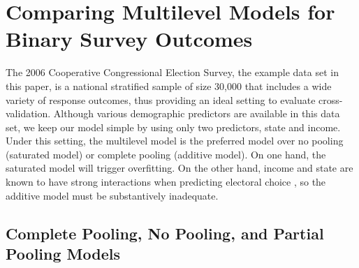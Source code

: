 \documentclass[sii]{ipart}
\begin{document}



\section{Comparing Multilevel Models for Binary Survey Outcomes}

The 2006 Cooperative Congressional Election Survey, the example data set in
this paper, is a national stratified sample of size 30,000 that includes a wide
variety of response outcomes,
thus providing an ideal setting to evaluate cross-validation. Although various
demographic predictors are available in this data set, we keep our model simple
by using only two predictors, state and income. Under this setting, the
multilevel model is the preferred model over no pooling (saturated model) or
complete pooling (additive model). On one hand, the saturated model will trigger
overfitting. On the other hand, income and state are known to have strong
interactions when predicting electoral choice \citep{redstate}, so the additive
model must be substantively inadequate.


\subsection{Complete Pooling, No Pooling, and Partial Pooling Models}
\end{document}
